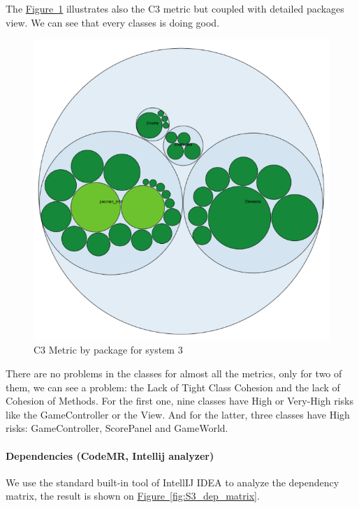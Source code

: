 \documentclass[]{article}
\newcommand{\wordlink}[2]{\hyperref[#2]{#1~\ref{#2}}}
\begin{document}
\newpage

The \wordlink{Figure}{fig:S3_codeMR_packages} illustrates also the C3 metric but coupled with detailed packages view. We can see that every classes is doing good. 
\vspace{0.2cm}
\begin{figure}[h]
\centering
\includegraphics[width=0.8\linewidth]{S3_codeMR_packages.png}
\caption{C3 Metric by package for system 3}
\label{fig:S3_codeMR_packages}
\end{figure}

There are no problems in the classes for almost all the metrics, only for two of them, we can see a problem: the Lack of Tight Class Cohesion  and the lack of Cohesion of Methods. 
For the first one, nine classes have High or Very-High risks like the GameController or the View. And for the latter, three classes have High risks: GameController, ScorePanel and GameWorld.

  
\newpage

\paragraph{Dependencies (CodeMR, Intellij analyzer)}


We use the standard built-in tool of IntellIJ IDEA to analyze the dependency matrix, the result is shown on  \wordlink{Figure}{fig:S3_dep_matrix}. 
\end{document}
